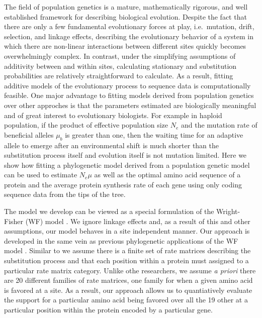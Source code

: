 \documentclass{article}
\newcommand{\Ne}{\ensuremath{{N_e}}\xspace} %
\newcommand{\Nemu}{\ensuremath{{N_e \mu}}\xspace} %
\begin{document}
The field of population genetics is a mature, mathematically rigorous, and well established framework for describing biological evolution.
Despite the fact that there are only a few fundamental evolutionary forces at play, i.e.~mutation, drift, selection, and linkage effects, describing the evolutionary behavior of a system in which there are non-linear interactions between different sites quickly becomes overwhelmingly complex.
In contrast, under the simplifying assumptions of additivity between and within sites, calculating stationary and substitution probabilities are relatively straightforward to calculate.
As a result, fitting additive models of the evolutionary process to sequence data is computationally feasible.
One major advantage to fitting models derived from population genetics over other approches is that the parameters estimated are biologically meaningful and of great interest to evolutionary biologists.
For example in haploid population, if the product of effective population size $\Ne$ and the mutation rate of beneficial alleles $\mu_b$ is greater than one, then the waiting time for an adaptive allele to emerge after an environmental shift is much shorter than the substitution process itself and evolution itself is not mutation limited.
Here we show how fitting a phylogenetic model derived from a population genetic model can be used to estimate $\Nemu$ as well as the optimal amino acid sequence of a protein and the average protein synthesis rate of each gene using only coding sequence data from the tips of the tree.

The model we develop can be viewed as a special formulation of the Wright-Fisher (WF) model \citep{Kimura1962,Wright1969,Iwasa1988,BergAndLassig2003,SellaAndHirsh2005}.
We ignore linkage effects and, as a result of this and other assumptions, our model behaves in a site independent manner.
Our approach is developed in the same vein as previous phylogenetic applications of the WF model \citep[e.g.][]{MuseAndGaut1994,HalpernAndBruno1998,YangAndNielsen2008,RodrigueEtAl2005,KoshiAndGoldstein1997,KoshiEtAl1999,DimmicEtAl2000,ThorneEtAl2012,LartillotAndPhilippe2004,RodrigueAndLartillot2014}. %
Similar to \citet{LartillotAndPhilippe2004,RodrigueAndLartillot2014} we assume there is a finite set of rate matrices describing the substitution process and that each position within a protein must assigned to a particular rate matrix category.%
Unlike othe researchers, we assume \emph{a priori} there are 20 different families of rate matrices, one family for when a given amino acid is favored at a site.
As a result, our approach allows us to quantiatively evaluate the support for a particular amino acid being favored over all the 19 other at a particular position within the protein encoded by a particular gene.
\end{document}
